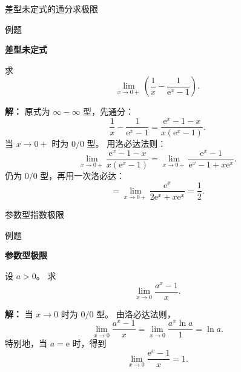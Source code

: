 \documentclass[aspectratio=169,10pt,fontset=fandol]{ctexbeamer}
\newcommand{\ee}{\mathrm{e}}
\begin{document}
\begin{frame}[t,fragile]{差型未定式的通分求极限}
\small
\begin{block}{例题}
{\small
\textbf{差型未定式}\par

求
\[
\lim_{x\to0+}\left(\frac1x-\frac1{\ee^x-1}\right).
\]

}
\end{block}
\pause
{\small
\textbf{解：}
原式为 $\infty-\infty$ 型，先通分：
\[
\frac1x-\frac1{\ee^x-1}
=\frac{\ee^x-1-x}{x(\ee^x-1)}.
\]
当 $x\to0+$ 时为 $0/0$ 型。 用洛必达法则：
\[
\lim_{x\to0+}\frac{\ee^x-1-x}{x(\ee^x-1)}
=\lim_{x\to0+}\frac{\ee^x-1}{\ee^x-1+x\ee^x}.
\]
仍为 $0/0$ 型，再用一次洛必达：
\[
=\lim_{x\to0+}\frac{\ee^x}{2\ee^x+x\ee^x}
=\frac12.
\]

}
\end{frame}
\begin{frame}[t,fragile]{参数型指数极限}
\normalsize
\begin{block}{例题}
{\normalsize
\textbf{参数型极限}\par

设 $a>0$。 求
\[
\lim_{x\to0}\frac{a^x-1}{x}.
\]

}
\end{block}
\pause
{\normalsize
\textbf{解：}
当 $x\to0$ 时为 $0/0$ 型。 由洛必达法则，
\[
\lim_{x\to0}\frac{a^x-1}{x}
=\lim_{x\to0}\frac{a^x\ln a}{1}
=\ln a.
\]
特别地，当 $a=\ee$ 时，得到
\[
\lim_{x\to0}\frac{\ee^x-1}{x}=1.
\]

}
\end{frame}
\end{document}
